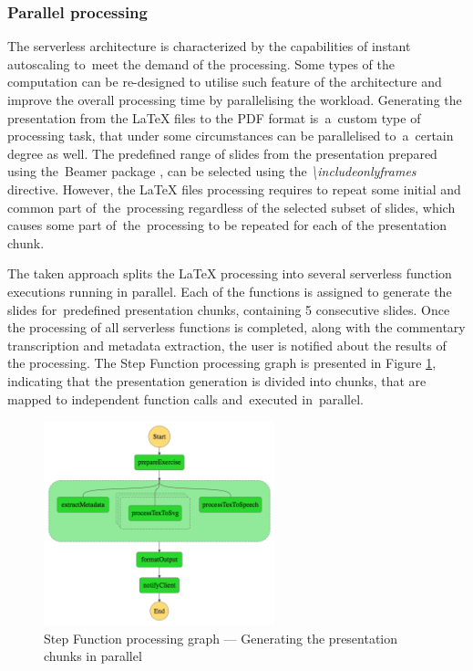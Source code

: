 \subsubsection{Parallel processing} \label{section:case-study-parallel-processing}

The serverless architecture is characterized by the capabilities of instant autoscaling to~meet the demand of the processing.
Some types of the computation can be re-designed to utilise such feature of the architecture and improve the overall processing time by parallelising the workload.
Generating the presentation from the LaTeX files to the PDF format is~a~custom type of processing task, that under some circumstances can be parallelised to~a~certain degree as well.
The predefined range of slides from the presentation prepared using the~Beamer package \cite{beamer}, can be selected using the \textit{\textbackslash includeonlyframes} directive.
However, the LaTeX files processing requires to repeat some initial and common part of~the~processing regardless of the selected subset of slides, which causes some part of~the~processing to be repeated for each of the presentation chunk.

The taken approach splits the LaTeX processing into several serverless function executions running in parallel. Each of the functions is assigned to generate the slides for~predefined presentation chunks, containing 5 consecutive slides. Once the processing of all serverless functions is completed, along with the commentary transcription and metadata extraction, the user is notified about the results of the processing. The Step Function processing graph is presented in Figure \ref{fig:step-function-processing-the-presentation-in-parallel}, indicating that the presentation generation is divided into chunks, that are mapped to independent function calls and~executed in~parallel.

\begin{figure}[]
    \centering
    \includegraphics[width=0.6\textwidth]{assets/04-serverless-for-web-apps/stepFunctionGraphParallel.png}
    \caption{Step Function processing graph --- Generating the presentation chunks in parallel}
    \label{fig:step-function-processing-the-presentation-in-parallel}
\end{figure}

